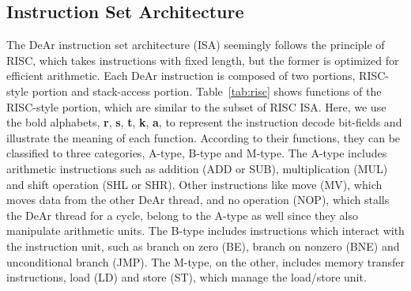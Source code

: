 \subsection{Instruction Set Architecture}
\label{sec:isa}
\indent The DeAr instruction set architecture (ISA) seemingly follows the principle of RISC, which takes instructions with fixed length, 
but the former is optimized for efficient arithmetic.
Each DeAr instruction is composed of two portions, RISC-style portion and stack-access portion.
Table~\ref{tab:risc} shows functions of the RISC-style portion, which are similar to the subset of RISC ISA.
Here, we use the bold alphabets, \textbf{r}, \textbf{s}, \textbf{t}, \textbf{k}, \textbf{a}, 
to represent the instruction decode bit-fields and illustrate the meaning of each function.
According to their functions, they can be classified to three categories, A-type, B-type and M-type.
The A-type includes arithmetic instructions such as addition (ADD or SUB), multiplication (MUL) and shift operation (SHL or SHR).
Other instructions like move (MV), which moves data from the other DeAr thread, 
and no operation (NOP), which stalls the DeAr thread for a cycle, 
belong to the A-type as well since they also manipulate arithmetic units.
The B-type includes instructions which interact with the instruction unit, such as branch on zero (BE), branch on nonzero (BNE) and unconditional branch (JMP).
The M-type, on the other, includes memory transfer instructions, load (LD) and store (ST), which manage the load/store unit.
